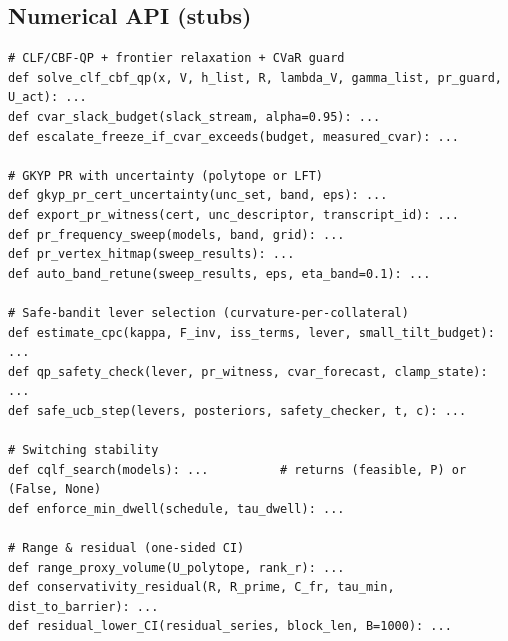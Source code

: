 \subsection*{Numerical API (stubs)}
\begin{lstlisting}
# CLF/CBF-QP + frontier relaxation + CVaR guard
def solve_clf_cbf_qp(x, V, h_list, R, lambda_V, gamma_list, pr_guard, U_act): ...
def cvar_slack_budget(slack_stream, alpha=0.95): ...
def escalate_freeze_if_cvar_exceeds(budget, measured_cvar): ...

# GKYP PR with uncertainty (polytope or LFT)
def gkyp_pr_cert_uncertainty(unc_set, band, eps): ...
def export_pr_witness(cert, unc_descriptor, transcript_id): ...
def pr_frequency_sweep(models, band, grid): ...
def pr_vertex_hitmap(sweep_results): ...
def auto_band_retune(sweep_results, eps, eta_band=0.1): ...

# Safe-bandit lever selection (curvature-per-collateral)
def estimate_cpc(kappa, F_inv, iss_terms, lever, small_tilt_budget): ...
def qp_safety_check(lever, pr_witness, cvar_forecast, clamp_state): ...
def safe_ucb_step(levers, posteriors, safety_checker, t, c): ...

# Switching stability
def cqlf_search(models): ...          # returns (feasible, P) or (False, None)
def enforce_min_dwell(schedule, tau_dwell): ...

# Range & residual (one-sided CI)
def range_proxy_volume(U_polytope, rank_r): ...
def conservativity_residual(R, R_prime, C_fr, tau_min, dist_to_barrier): ...
def residual_lower_CI(residual_series, block_len, B=1000): ...
\end{lstlisting}

